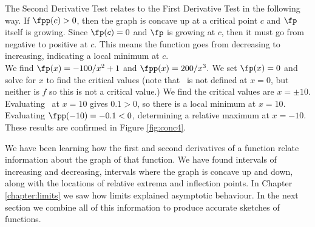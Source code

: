 
The Second Derivative Test relates to the First Derivative Test in the following way. If $\fpp(c)>0$, then the graph is concave up at a critical point $c$ and $\fp$ itself is growing.  Since $\fp(c)=0$ and $\fp$ is growing at $c$, then it must go from negative to positive at $c$.  This means the function goes from decreasing to increasing, indicating a local minimum at $c$.\\
\clearpage
{}
{We find $\fp(x)=-100/x^2+1$ and $\fpp(x) = 200/x^3.$  We set $\fp(x)=0$ and solve for $x$ to find the critical values (note that \fp\ is not defined at $x=0$, but neither is $f$ so this is not a critical value.) We find  the critical values are $x=\pm 10$.  Evaluating \fpp\ at $x=10$ gives $0.1>0$, so there is a local minimum at $x=10$.  Evaluating $\fpp(-10)=-0.1<0$, determining a relative maximum at  $x=-10$. These results are confirmed in Figure \ref{fig:conc4}.
}\\


We have been learning how the first and second derivatives of a function relate information about the graph of that function. We have found intervals of increasing and decreasing, intervals where the graph is concave up and down, along with the locations of relative extrema and inflection points. In Chapter \ref{chapter:limits} we saw how limits explained asymptotic behaviour. In the next section we combine all of this information to produce accurate sketches of functions.


